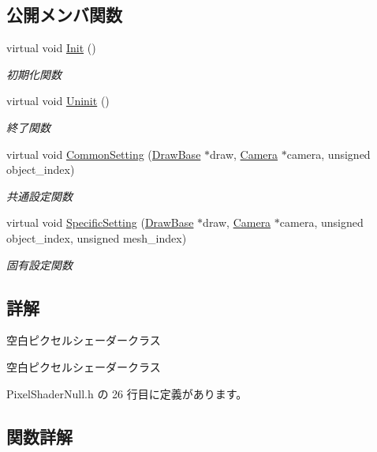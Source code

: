 \subsection*{公開メンバ関数}
\begin{DoxyCompactItemize}
\item 
virtual void \mbox{\hyperlink{class_pixel_shader_null_abfd7a6a986da09061a55d31024219eba}{Init}} ()
\begin{DoxyCompactList}\small\item\em 初期化関数 \end{DoxyCompactList}\item 
virtual void \mbox{\hyperlink{class_pixel_shader_null_ae5ee2fa95e5da787918ccbd1877cd0ef}{Uninit}} ()
\begin{DoxyCompactList}\small\item\em 終了関数 \end{DoxyCompactList}\item 
virtual void \mbox{\hyperlink{class_pixel_shader_null_a99c712ab174da29ba26a893820b64799}{Common\+Setting}} (\mbox{\hyperlink{class_draw_base}{Draw\+Base}} $\ast$draw, \mbox{\hyperlink{class_camera}{Camera}} $\ast$camera, unsigned object\+\_\+index)
\begin{DoxyCompactList}\small\item\em 共通設定関数 \end{DoxyCompactList}\item 
virtual void \mbox{\hyperlink{class_pixel_shader_null_a8dd0194b5a22da5261ab35233a7cfdcd}{Specific\+Setting}} (\mbox{\hyperlink{class_draw_base}{Draw\+Base}} $\ast$draw, \mbox{\hyperlink{class_camera}{Camera}} $\ast$camera, unsigned object\+\_\+index, unsigned mesh\+\_\+index)
\begin{DoxyCompactList}\small\item\em 固有設定関数 \end{DoxyCompactList}\end{DoxyCompactItemize}


\subsection{詳解}
空白ピクセルシェーダークラス 

空白ピクセルシェーダークラス 

 Pixel\+Shader\+Null.\+h の 26 行目に定義があります。



\subsection{関数詳解}
\mbox{\label{class_pixel_shader_null_a99c712ab174da29ba26a893820b64799}} 
